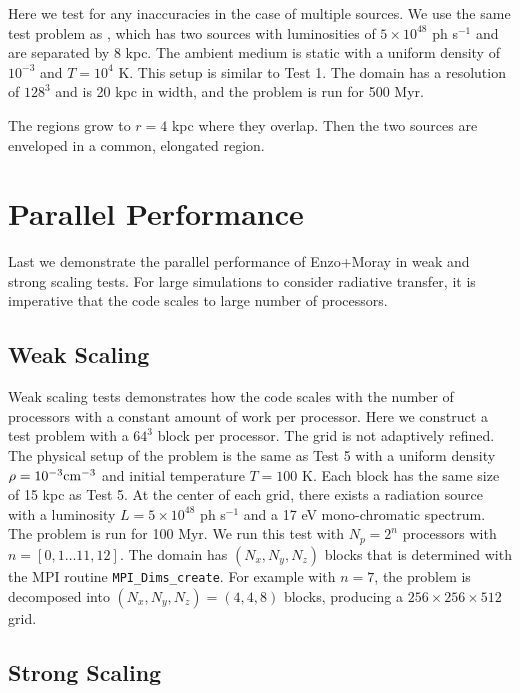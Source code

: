 \documentclass[12pt,preprint]{aastex}
\begin{document}
Here we test for any inaccuracies in the case of multiple sources.  We
use the same test problem as \citet[][\S5.1.2]{Petkova09}, which has
two sources with luminosities of $5 \times 10^{48}$ ph s$^{-1}$ and
are separated by 8 kpc.  The ambient medium is static with a uniform
density of $10^{-3}$ \cubecm and $T = 10^4$ K.  This setup is similar
to Test 1.  The domain has a resolution of $128^3$ and is 20 kpc in
width, and the problem is run for 500 Myr.  

The  regions grow to $r = 4$ kpc where they overlap.  Then
the two sources are enveloped in a common, elongated 
region.

\section{Parallel Performance}

Last we demonstrate the parallel performance of Enzo+Moray in weak and
strong scaling tests.  For large simulations to consider radiative
transfer, it is imperative that the code scales to large number of
processors.

\subsection{Weak Scaling}
\label{sec:weak_sc}

Weak scaling tests demonstrates how the code scales with the number of
processors with a constant amount of work per processor.  Here we
construct a test problem with a $64^3$ block per processor.  The grid
is not adaptively refined.  The physical setup of the problem is the
same as Test 5 with a uniform density $\rho = 10^{-3} \cubecm$ and
initial temperature $T = 100$ K.  Each block has the same size of 15
kpc as Test 5.  At the center of each grid, there exists a radiation
source with a luminosity $L = 5 \times 10^{48}$ ph s$^{-1}$ and a 17
eV mono-chromatic spectrum.  The problem is run for 100 Myr.  We run
this test with $N_p = 2^n$ processors with $n = [0,1 \dots 11,12]$.
The domain has $(N_x, N_y, N_z)$ blocks that is determined with the
MPI routine \texttt{MPI\_Dims\_create}.  For example with $n = 7$, the
problem is decomposed into $(N_x, N_y, N_z) = (4,4,8)$ blocks,
producing a $256 \times 256 \times 512$ grid.

\subsection{Strong Scaling}
\label{sec:strong_sc}
\end{document}
